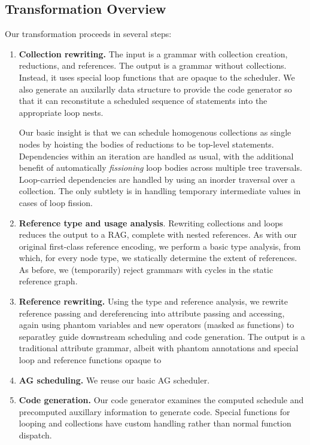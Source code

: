 \subsection{Transformation Overview}
Our transformation proceeds in several steps:
\begin{enumerate}
\item \textbf{Collection rewriting.} The input is a grammar with collection creation, reductions, and references. The output is a grammar without collections. Instead, it uses special loop functions that are opaque to the scheduler. We also generate an auxilarlly data structure to provide the code generator so that it can reconstitute a scheduled sequence of statements into the appropriate loop nests.

Our basic insight is that we can schedule homogenous collections as single nodes by hoisting the bodies of reductions to be top-level statements. Dependencies within an iteration are handled as usual, with the additional benefit of automatically \emph{fissioning} loop bodies across multiple tree traversals. Loop-carried dependencies are handled by using an inorder traversal over a collection. The only subtlety is in handling temporary intermediate values in cases of loop fission.
\item \textbf{Reference type and usage analysis}. Rewriting collections and loops reduces the output to a RAG, complete with nested references. As with our original first-class reference encoding, we perform a basic type analysis, from which, for every node type, we statically determine the extent of references. As before, we (temporarily) reject grammars with cycles in the static reference graph. %
\item \textbf{Reference rewriting.} Using the type and reference analysis, we rewrite reference passing and dereferencing into attribute passing and accessing, again using phantom variables and new operators (masked as functions) to separatley guide downstream scheduling and code generation. The output is a traditional attribute grammar, albeit with phantom annotations and special loop and reference functions opaque to 
\item \textbf{AG scheduling.} We reuse our basic AG scheduler.
\item \textbf{Code generation.} Our code generator examines the computed schedule and precomputed auxillary information to generate code. Special functions for looping and collections have custom handling rather than normal function dispatch.
\end{enumerate}


